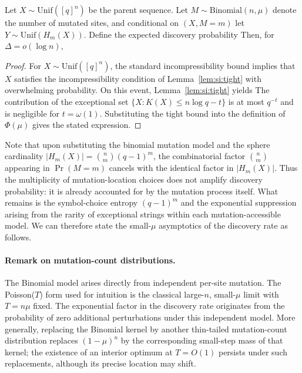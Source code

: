 \begin{corollary}\label{cor:si:Phi}
Let $X\sim \mathrm{Unif}([q]^n)$ be the parent sequence.
Let $M\sim \mathrm{Binomial}(n,\mu)$ denote the number of mutated sites,
and conditional on $(X,M=m)$ let $Y\sim \mathrm{Unif}(H_m(X))$. Define the expected discovery probability
Then, for $\Delta=o(\log n)$,
\end{corollary}

\begin{proof}
For $X\sim \mathrm{Unif}([q]^n)$, the standard incompressibility bound
implies that $X$ satisfies the incompressibility condition of Lemma~\ref{lem:si:tight}
with overwhelming probability. On this event, Lemma~\ref{lem:si:tight} yields
The contribution of the exceptional set $\{X: K(X)\le n\log q - t\}$ is at most $q^{-t}$ and is negligible
for $t=\omega(1)$. Substituting the tight bound into the definition of $\Phi(\mu)$ gives the stated expression.
\end{proof}

Note that upon substituting the binomial mutation model and the sphere cardinality
$|H_m(X)|=\binom{n}{m}(q-1)^m$, the combinatorial factor $\binom{n}{m}$ appearing in $\Pr(M=m)$ cancels
with the identical factor in $|H_m(X)|$. Thus the multiplicity of mutation-location choices does not amplify
discovery probability: it is already accounted for by the mutation process itself. What remains is the symbol-choice
entropy $(q-1)^m$ and the exponential suppression arising from the rarity of exceptional strings within each
mutation-accessible model. We can therefore state the small-$\mu$ asymptotics of the discovery rate as follows.


\paragraph{Remark on mutation-count distributions.}
The Binomial model arises directly from independent per-site mutation. The Poisson($T$) form used for intuition is the classical large-$n$, small-$\mu$ limit with $T=n\mu$ fixed. The exponential factor in the discovery rate originates from the probability of zero additional perturbations under this independent model. More generally, replacing the Binomial kernel by another thin-tailed mutation-count distribution replaces $(1-\mu)^n$ by the corresponding small-step mass of that kernel; the existence of an interior optimum at $T=O(1)$ persists under such replacements, although its precise location may shift.





